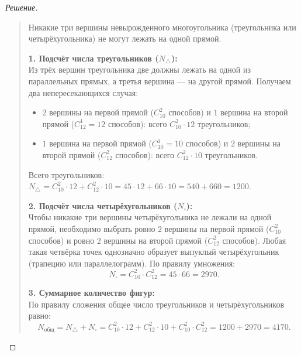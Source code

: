 \begin{proof}[Решение]~\\
    \begin{quote}
        Никакие три вершины невырожденного многоугольника (треугольника или 
        четырёхугольника) не могут лежать на одной прямой.

        \textbf{1. Подсчёт числа треугольников ($N_{\triangle}$):}\\
        Из трёх вершин треугольника две должны лежать на одной из 
        параллельных прямых, а третья вершина --- на другой прямой. 
        Получаем два непересекающихся случая:
        \begin{itemize}
            \item $2$ вершины на первой прямой ($C_{10}^2$ способов) и $1$ 
            вершина на второй прямой ($C_{12}^1 = 12$ способов): всего 
            $C_{10}^2 \cdot 12$ треугольников;
            \item $1$ вершина на первой прямой ($C_{10}^1 = 10$ способов) и 
            $2$ вершины на второй прямой ($C_{12}^2$ способов): всего 
            $C_{12}^2 \cdot 10$ треугольников.
        \end{itemize}
        Всего треугольников: $N_{\triangle} = C_{10}^2 \cdot 12 + 
        C_{12}^2 \cdot 10 = 45 \cdot 12 + 66 \cdot 10 = 540 + 660 = 1200$.

        \textbf{2. Подсчёт числа четырёхугольников ($N_{\square}$):}\\
        Чтобы никакие три вершины четырёхугольника не лежали на одной 
        прямой, необходимо выбрать ровно $2$ вершины на первой прямой 
        ($C_{10}^2$ способов) и ровно $2$ вершины на второй прямой 
        ($C_{12}^2$ способов). Любая такая четвёрка точек однозначно 
        образует выпуклый четырёхугольник (трапецию или параллелограмм). 
        По правилу умножения:
        \[
            N_{\square} = C_{10}^2 \cdot C_{12}^2 = 45 \cdot 66 = 2970.
        \]

        \textbf{3. Суммарное количество фигур:}\\
        По правилу сложения общее число треугольников и четырёхугольников 
        равно:
        \begin{equation} \label{eq:tri_quad_sum}
            N_{\text{общ}} = N_{\triangle} + N_{\square} = 
            C_{10}^2 \cdot 12 + C_{12}^2 \cdot 10 + C_{10}^2 \cdot C_{12}^2 = 
            1200 + 2970 = 4170. \tag{3}
        \end{equation}
    \end{quote}
\end{proof}

